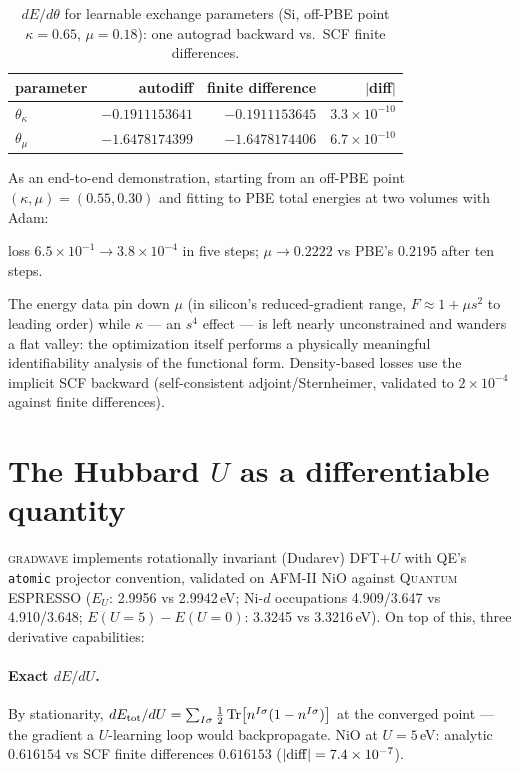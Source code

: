 \documentclass[11pt]{article}
\newcommand{\gw}{\textsc{gradwave}}
\newcommand{\qe}{\textsc{Quantum ESPRESSO}}
\begin{document}
\begin{table}[h]\centering
\caption{$dE/d\theta$ for learnable exchange parameters (Si, off-PBE point
$\kappa=0.65$, $\mu=0.18$): one autograd backward vs.\ SCF finite
differences.}
\label{tab:xc}
\begin{tabular}{lrrr}
\toprule
parameter & autodiff & finite difference & $|$diff$|$ \\
\midrule
$\theta_\kappa$ & $-0.1911153641$ & $-0.1911153645$ & $3.3\times10^{-10}$ \\
$\theta_\mu$    & $-1.6478174399$ & $-1.6478174406$ & $6.7\times10^{-10}$ \\
\bottomrule
\end{tabular}
\end{table}

As an end-to-end demonstration, starting from an off-PBE point
$(\kappa,\mu) = (0.55, 0.30)$ and fitting to PBE total energies at two
volumes with Adam:
\begin{center}
loss $6.5\times10^{-1} \rightarrow 3.8\times10^{-4}$ in five steps;\quad
$\mu \rightarrow 0.2222$ vs PBE's $0.2195$ after ten steps.
\end{center}
The energy data pin down $\mu$ (in silicon's reduced-gradient range,
$F \approx 1 + \mu s^2$ to leading order) while $\kappa$ --- an $s^4$
effect --- is left nearly unconstrained and wanders a flat valley: the
optimization itself performs a physically meaningful identifiability
analysis of the functional form. Density-based losses use the implicit SCF backward
(self-consistent adjoint/Sternheimer, validated to $2\times10^{-4}$ against
finite differences).

\section{The Hubbard $U$ as a differentiable quantity}
\label{sec:hubbardu}

\gw{} implements rotationally invariant (Dudarev) DFT+$U$ with QE's
\texttt{atomic} projector convention, validated on AFM-II NiO against \qe{}
($E_U$: 2.9956 vs 2.9942\,eV; Ni-$d$ occupations 4.909/3.647 vs 4.910/3.648;
$E(U{=}5) - E(U{=}0)$: 3.3245 vs 3.3216\,eV). On top of this, three
derivative capabilities:

\paragraph{Exact $dE/dU$.} By stationarity, $dE_{\rm tot}/dU = \sum_{I\sigma}
\tfrac12\,{\rm Tr}\!\left[n^{I\sigma}(1-n^{I\sigma})\right]$ at the converged
point --- the gradient a $U$-learning loop would backpropagate. NiO at
$U=5$\,eV: analytic $0.616154$ vs SCF finite differences $0.616153$
($|{\rm diff}| = 7.4\times10^{-7}$).
\end{document}
